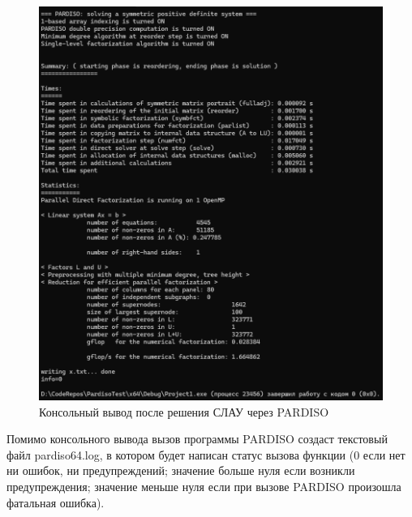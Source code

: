 \begin{figure}
	\centering
	\vspace*{0.7cm}
	\includegraphics[width=1.0\linewidth]{images/resultPardiso.png}
	\caption{Консольный вывод после решения СЛАУ через PARDISO}
	\label{fig:ExamplePARDISO}
\end{figure}

Помимо консольного вывода вызов программы PARDISO создаст текстовый файл pardiso64.log, в котором будет написан статус вызова функции (0 если нет ни ошибок, ни предупреждений; значение больше нуля если возникли предупреждения; значение меньше нуля если при вызове PARDISO произошла фатальная ошибка).


